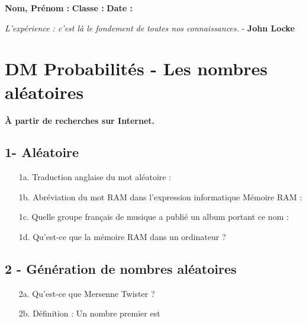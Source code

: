 



\textbf{Nom, Prénom :} \hspace{8cm} \textbf{Classe :} \hspace{3cm} \textbf{Date :}\\


\begin{center}
  \textit{L’expérience : c’est là le fondement de toutes nos connaissances.}  - \textbf{John Locke}
\end{center}


\section*{DM Probabilités - Les nombres aléatoires}

\textbf{À partir de recherches sur Internet.}

\subsection*{1- Aléatoire}

\begin{enumerate}
    \item[1a.] Traduction anglaise du mot aléatoire : \dotfill
    \item[1b.] Abréviation du mot RAM dans l'expression informatique Mémoire RAM : \dotfill
    \item[1c.] Quelle groupe français de musique a publié un album portant ce nom : \dotfill
    \item[1d.] Qu’est-ce que la mémoire RAM dans un ordinateur ? \\ \Pointilles[8]
\end{enumerate} 


\subsection*{2 - Génération de nombres aléatoires}

\begin{enumerate}
    \item[2a.] Qu'est-ce que Mersenne Twister ? \\ \Pointilles[8]
    \item[2b.] Définition : Un nombre premier est \dotfill \\ \Pointilles[1]
\end{enumerate} 

\newpage

